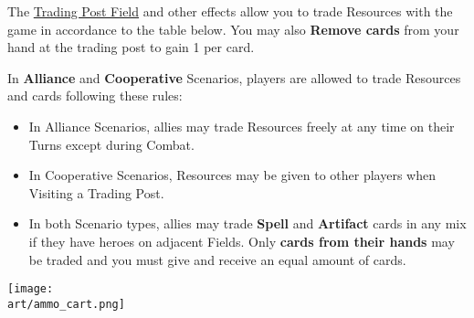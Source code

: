 \begin{multicols}{2}

The \hyperlink{Trading Post}{Trading Post Field} and other effects allow you to \hypertarget{Trading}{trade} Resources with the game in accordance to the table below.
You may also \textbf{Remove cards} from your hand at the trading post to gain 1  per card.\par
{}\par
In \textbf{Alliance} and \textbf{Cooperative} Scenarios, players are allowed to trade Resources and cards following these rules:
\begin{itemize}
  \item In Alliance Scenarios, allies may trade Resources freely at any time on their Turns except during Combat.
  \item In Cooperative Scenarios, Resources may be given to other players when Visiting a Trading Post.
  \columnbreak
  \item In both Scenario types, allies may trade \textbf{Spell} and \textbf{Artifact} cards in any mix if they have heroes on adjacent Fields.
    Only \textbf{cards from their hands} may be traded and you must give and receive an equal amount of cards.
\end{itemize}

\vspace*{\fill}
\texttt{[image: \\art/ammo\_cart.png]}

\end{multicols}

\vfill

